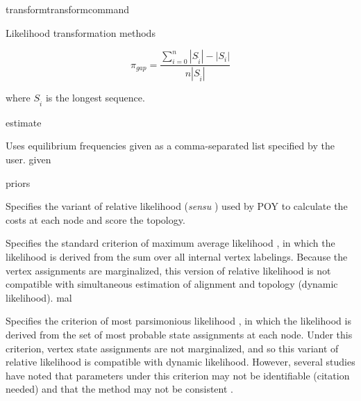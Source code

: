 \begin{command}{transform}{transformcommand}
\begin{arguments}
\begin{argumentgroup}{Likelihood transformation methods}
{\begin{description}
{                           
                            \begin{equation*}
                            \pi_{gap} = \frac{\sum_{i=0}^n
                            |S_{\hat{i}}| - |S_i|}{n |S_{\hat{i}}|}
                            \end{equation*}
                            
                             where
                            $S_{\hat{i}}$ is the longest sequence.}
                            {estimate}

                            {Uses equilibrium frequencies given as a
                            comma-separated list specified by the user.}
                            {given}

                    \end{description}}
                {priors}

                    {Specifies the variant of relative likelihood (\textit{sensu}
                    \cite{steel2000parsimony}) used by POY to calculate the costs at
                    each node and score the topology.

                    \begin{description}

                            {Specifies the standard criterion of maximum average
                            likelihood \cite{felsenstein1981}, in which the
                            likelihood is derived from the sum over all internal
                            vertex labelings. Because the vertex assignments are
                            marginalized, this version of relative likelihood is not
                            compatible with simultaneous estimation of alignment and
                            topology (dynamic likelihood).}
                            {mal}

                            {Specifies the criterion of most parsimonious likelihood
                            \cite{barryandhartigan1987}, in which the likelihood is
                            derived from the set of most probable state assignments
                            at each node. Under this criterion, vertex state
                            assignments are not marginalized, and so this variant of
                            relative likelihood is compatible with dynamic
                            likelihood. However, several studies have noted that
                            parameters under this criterion may not be identifiable
                            (citation needed) and that the method may not be consistent
                            \cite[for example]{mossel2009shrinkage}.
                            
}
\end{description}}
\end{argumentgroup}
\end{arguments}
\end{command}

